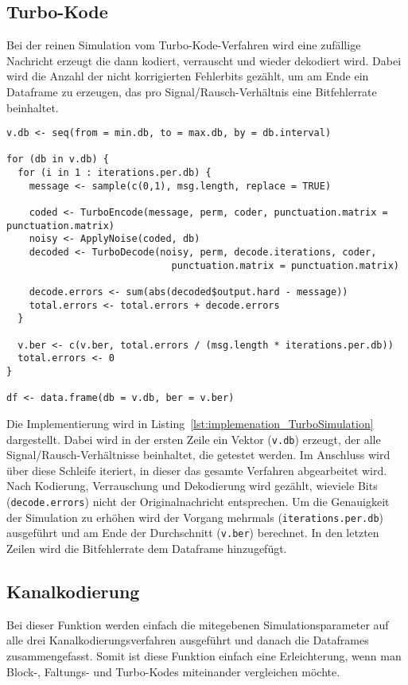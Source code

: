 \subsection{Turbo-Kode}
\label{sec:implementation_turbo}
Bei der reinen Simulation vom Turbo-Kode-Verfahren wird eine zufällige Nachricht erzeugt die dann kodiert, verrauscht und wieder dekodiert wird. Dabei wird die Anzahl der nicht korrigierten Fehlerbits gezählt, um am Ende ein Dataframe zu erzeugen, das pro Signal/Rausch-Verhältnis eine Bitfehlerrate beinhaltet.

\begin{lstlisting}[caption=Implementierung von \texttt{TurboSimulation}, label={lst:implemenation_TurboSimulation}, float=!th]
v.db <- seq(from = min.db, to = max.db, by = db.interval)

for (db in v.db) {
  for (i in 1 : iterations.per.db) {
    message <- sample(c(0,1), msg.length, replace = TRUE)
    
    coded <- TurboEncode(message, perm, coder, punctuation.matrix = punctuation.matrix)
    noisy <- ApplyNoise(coded, db)
    decoded <- TurboDecode(noisy, perm, decode.iterations, coder,
                             punctuation.matrix = punctuation.matrix)
                             
    decode.errors <- sum(abs(decoded$output.hard - message))
    total.errors <- total.errors + decode.errors
  }

  v.ber <- c(v.ber, total.errors / (msg.length * iterations.per.db))
  total.errors <- 0
}

df <- data.frame(db = v.db, ber = v.ber)
\end{lstlisting}

Die Implementierung wird in Listing~\ref{lst:implemenation_TurboSimulation} dargestellt. Dabei wird in der ersten Zeile ein Vektor (\texttt{v.db}) erzeugt, der alle Signal/Rausch-Verhältnisse beinhaltet, die getestet werden. Im Anschluss wird über diese Schleife iteriert, in dieser das gesamte Verfahren abgearbeitet wird. Nach Kodierung, Verrauschung und Dekodierung wird gezählt, wieviele Bits (\texttt{decode.errors}) nicht der Originalnachricht entsprechen. Um die Genauigkeit der Simulation zu erhöhen wird der Vorgang mehrmals (\texttt{iterations.per.db}) ausgeführt und am Ende der Durchschnitt (\texttt{v.ber}) berechnet. In den letzten Zeilen wird die Bitfehlerrate dem Dataframe hinzugefügt.

\FloatBarrier
\subsection{Kanalkodierung}
\label{sec:implementation_channelcoding}
Bei dieser Funktion werden einfach die mitegebenen Simulationsparameter auf alle drei Kanalkodierungsverfahren ausgeführt und danach die Dataframes zusammengefasst. Somit ist diese Funktion einfach eine Erleichterung, wenn man Block-, Faltungs- und Turbo-Kodes miteinander vergleichen möchte.

